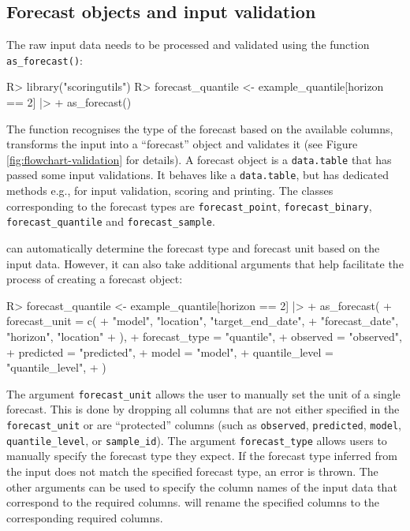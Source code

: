\documentclass[
]{jss}
\begin{document}
\subsection{Forecast objects and input validation} \label{sec:validation}

The raw input data needs to be processed and validated using the
function \texttt{as\_forecast()}:

\begin{CodeChunk}
\begin{CodeInput}
R> library("scoringutils")
R> forecast_quantile <- example_quantile[horizon == 2] |>
+   as_forecast() 
\end{CodeInput}
\end{CodeChunk}

The function  recognises the type of the forecast
based on the available columns, transforms the input into a ``forecast''
object and validates it (see Figure \ref{fig:flowchart-validation} for
details). A forecast object is a \texttt{data.table} that has passed
some input validations. It behaves like a \texttt{data.table}, but has
dedicated methods e.g., for input validation, scoring and printing. The
classes corresponding to the forecast types are
\texttt{forecast\_point}, \texttt{forecast\_binary},
\texttt{forecast\_quantile} and \texttt{forecast\_sample}.

 can automatically determine the forecast type and
forecast unit based on the input data. However, it can also take
additional arguments that help facilitate the process of creating a
forecast object:

\begin{CodeChunk}
\begin{CodeInput}
R> forecast_quantile <- example_quantile[horizon == 2] |>
+   as_forecast(
+     forecast_unit = c(
+       "model", "location", "target_end_date", 
+       "forecast_date", "horizon", "location"
+     ),
+     forecast_type = "quantile",
+     observed = "observed", 
+     predicted = "predicted",
+     model = "model",
+     quantile_level = "quantile_level",
+   ) 
\end{CodeInput}
\end{CodeChunk}

The argument \texttt{forecast\_unit} allows the user to manually set the
unit of a single forecast. This is done by dropping all columns that are
not either specified in the \texttt{forecast\_unit} or are ``protected''
columns (such as \texttt{observed}, \texttt{predicted}, \texttt{model},
\texttt{quantile\_level}, or \texttt{sample\_id}). The argument
\texttt{forecast\_type} allows users to manually specify the forecast
type they expect. If the forecast type inferred from the input does not
match the specified forecast type, an error is thrown. The other
arguments can be used to specify the column names of the input data that
correspond to the required columns.  will rename
the specified columns to the corresponding required columns.
\end{document}
